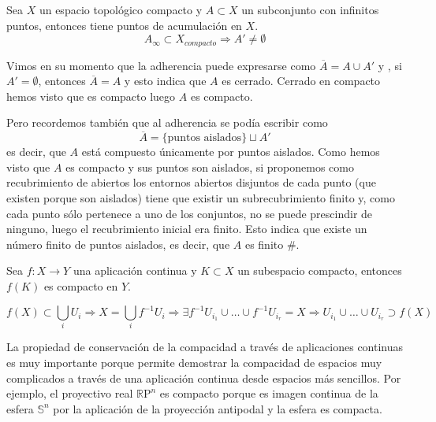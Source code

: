 \begin{prop}[Mantra 2]
Sea $X$ un espacio topológico compacto y $A\subset X$ un subconjunto con infinitos puntos, entonces tiene puntos de acumulación en $X$.
\[
A_\infty \subset X_{compacto} \Rightarrow A' \neq \emptyset
\]
\end{prop}
\begin{demo}
Vimos en su momento que la adherencia puede expresarse como $\overline{A} = A \cup A'$ y , si $A' = \emptyset$, entonces $\overline{A} = A$ y esto indica que $A$ es cerrado. Cerrado en compacto hemos visto que es compacto luego $A$ es compacto.

Pero recordemos también que al adherencia se podía escribir como
\[
\overline{A} = \{\text{puntos aislados}\} \sqcup A'
\]
es decir, que $A$ está compuesto únicamente por puntos aislados. Como hemos visto que $A$ es compacto y sus puntos son aislados, si proponemos como recubrimiento de abiertos los entornos abiertos disjuntos de cada punto (que existen porque son aislados) tiene que existir un subrecubrimiento finito y, como cada punto sólo pertenece a uno de los conjuntos, no se puede prescindir de ninguno, luego el recubrimiento inicial era finito. Esto indica que existe un número finito de puntos aislados, es decir, que $A$ es finito \#.
\end{demo}

\begin{prop}[Mantra 3]
Sea $f:X\rightarrow Y$ una aplicación continua y $K\subset X$ un subespacio compacto, entonces $f(K)$ es compacto en $Y$.
\end{prop}
\begin{demo}
\[
f\left( X \right) \subset \bigcup_{i} U_i \Rightarrow X = \bigcup_{i} f^{-1} U_i \Rightarrow \exists f^{-1}U_{i_1} \cup \ldots \cup f^{-1}U_{i_r} = X \Rightarrow U_{i_1} \cup \ldots \cup U_{i_r} \supset f\left( X \right)
\]
\end{demo}

\begin{ej}
La propiedad de conservación de la compacidad a través de aplicaciones continuas es muy importante porque permite demostrar la compacidad de espacios muy complicados a través de una aplicación continua desde espacios más sencillos. Por ejemplo, el proyectivo real $\mathbb{R} \mathrm{P}^n$ es compacto porque es imagen continua de la esfera $\mathbb{S}^n$ por la aplicación de la proyección antipodal y la esfera es compacta.
\end{ej}

